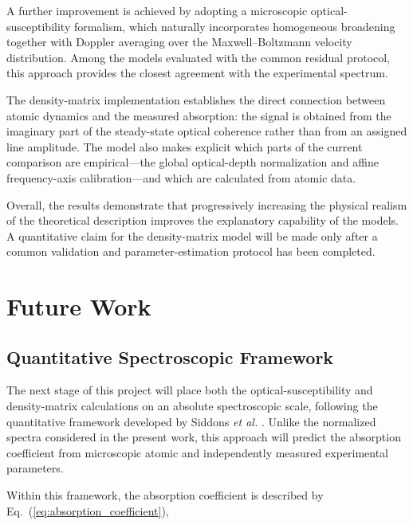 \documentclass[11pt]{article}
\numberwithin{equation}{section}
\begin{document}
A further improvement is achieved by adopting a microscopic optical-susceptibility formalism, which naturally incorporates homogeneous broadening together with Doppler averaging over the Maxwell--Boltzmann velocity distribution. Among the models evaluated with the common residual protocol, this approach provides the closest agreement with the experimental spectrum.

The density-matrix implementation establishes the direct connection between atomic dynamics and the measured absorption: the signal is obtained from the imaginary part of the steady-state optical coherence rather than from an assigned line amplitude. The model also makes explicit which parts of the current comparison are empirical---the global optical-depth normalization and affine frequency-axis calibration---and which are calculated from atomic data.

Overall, the results demonstrate that progressively increasing the physical realism of the theoretical description improves the explanatory capability of the models. A quantitative claim for the density-matrix model will be made only after a common validation and parameter-estimation protocol has been completed.

\section{Future Work}

\subsection{Quantitative Spectroscopic Framework}

The next stage of this project will place both the optical-susceptibility and density-matrix calculations on an absolute spectroscopic scale, following the quantitative framework developed by Siddons \textit{et al.} \cite{Siddons2008}. Unlike the normalized spectra considered in the present work, this approach will predict the absorption coefficient from microscopic atomic and independently measured experimental parameters.

Within this framework, the absorption coefficient is described by Eq.~(\ref{eq:absorption_coefficient}),
\end{document}

